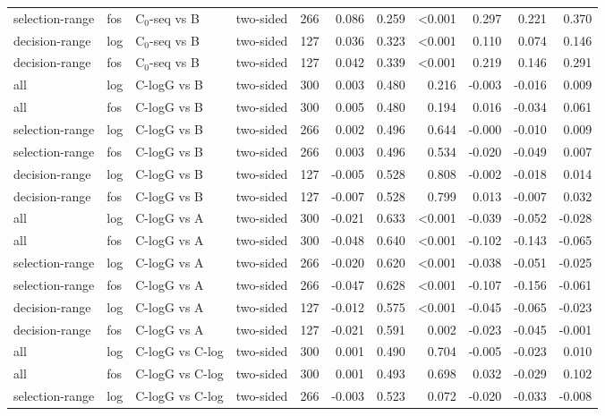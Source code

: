 \begin{longtable}{llllrrrrrrr}
selection-range & fos & C$_0$-seq vs B & two-sided & 266 & 0.086 & 0.259 & <0.001 & 0.297 & 0.221 & 0.370 \\
decision-range & log & C$_0$-seq vs B & two-sided & 127 & 0.036 & 0.323 & <0.001 & 0.110 & 0.074 & 0.146 \\
decision-range & fos & C$_0$-seq vs B & two-sided & 127 & 0.042 & 0.339 & <0.001 & 0.219 & 0.146 & 0.291 \\
all & log & C-logG vs B & two-sided & 300 & 0.003 & 0.480 & 0.216 & -0.003 & -0.016 & 0.009 \\
all & fos & C-logG vs B & two-sided & 300 & 0.005 & 0.480 & 0.194 & 0.016 & -0.034 & 0.061 \\
selection-range & log & C-logG vs B & two-sided & 266 & 0.002 & 0.496 & 0.644 & -0.000 & -0.010 & 0.009 \\
selection-range & fos & C-logG vs B & two-sided & 266 & 0.003 & 0.496 & 0.534 & -0.020 & -0.049 & 0.007 \\
decision-range & log & C-logG vs B & two-sided & 127 & -0.005 & 0.528 & 0.808 & -0.002 & -0.018 & 0.014 \\
decision-range & fos & C-logG vs B & two-sided & 127 & -0.007 & 0.528 & 0.799 & 0.013 & -0.007 & 0.032 \\
all & log & C-logG vs A & two-sided & 300 & -0.021 & 0.633 & <0.001 & -0.039 & -0.052 & -0.028 \\
all & fos & C-logG vs A & two-sided & 300 & -0.048 & 0.640 & <0.001 & -0.102 & -0.143 & -0.065 \\
selection-range & log & C-logG vs A & two-sided & 266 & -0.020 & 0.620 & <0.001 & -0.038 & -0.051 & -0.025 \\
selection-range & fos & C-logG vs A & two-sided & 266 & -0.047 & 0.628 & <0.001 & -0.107 & -0.156 & -0.061 \\
decision-range & log & C-logG vs A & two-sided & 127 & -0.012 & 0.575 & <0.001 & -0.045 & -0.065 & -0.023 \\
decision-range & fos & C-logG vs A & two-sided & 127 & -0.021 & 0.591 & 0.002 & -0.023 & -0.045 & -0.001 \\
all & log & C-logG vs C-log & two-sided & 300 & 0.001 & 0.490 & 0.704 & -0.005 & -0.023 & 0.010 \\
all & fos & C-logG vs C-log & two-sided & 300 & 0.001 & 0.493 & 0.698 & 0.032 & -0.029 & 0.102 \\
selection-range & log & C-logG vs C-log & two-sided & 266 & -0.003 & 0.523 & 0.072 & -0.020 & -0.033 & -0.008 \\

\end{longtable}
